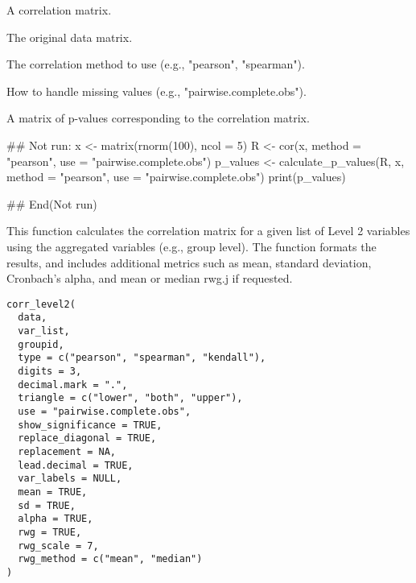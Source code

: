 \documentclass[a4paper]{book}
\begin{document}
%
\begin{Arguments}
\begin{ldescription}
\item[\code{R}] A correlation matrix.

\item[\code{x}] The original data matrix.

\item[\code{method}] The correlation method to use (e.g., "pearson", "spearman").

\item[\code{use}] How to handle missing values (e.g., "pairwise.complete.obs").
\end{ldescription}
\end{Arguments}
%
\begin{Value}
A matrix of p-values corresponding to the correlation matrix.
\end{Value}
%
\begin{Examples}
\begin{ExampleCode}
## Not run: 
x <- matrix(rnorm(100), ncol = 5)
R <- cor(x, method = "pearson", use = "pairwise.complete.obs")
p_values <- calculate_p_values(R, x, method = "pearson", use = "pairwise.complete.obs")
print(p_values)

## End(Not run)

\end{ExampleCode}
\end{Examples}
%
\begin{Description}
This function calculates the correlation matrix for a given list of Level 2
variables using the aggregated variables (e.g., group level). The function
formats the results, and includes additional metrics such as mean, standard deviation,
Cronbach's alpha, and mean or median rwg.j if requested.
\end{Description}
%
\begin{Usage}
\begin{verbatim}
corr_level2(
  data,
  var_list,
  groupid,
  type = c("pearson", "spearman", "kendall"),
  digits = 3,
  decimal.mark = ".",
  triangle = c("lower", "both", "upper"),
  use = "pairwise.complete.obs",
  show_significance = TRUE,
  replace_diagonal = TRUE,
  replacement = NA,
  lead.decimal = TRUE,
  var_labels = NULL,
  mean = TRUE,
  sd = TRUE,
  alpha = TRUE,
  rwg = TRUE,
  rwg_scale = 7,
  rwg_method = c("mean", "median")
)
\end{verbatim}
\end{Usage}
\end{document}
